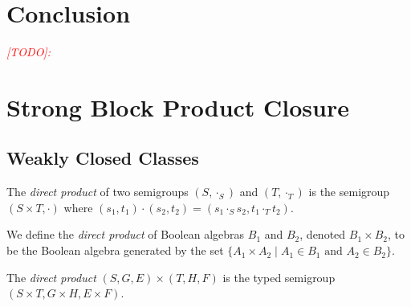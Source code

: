 \documentclass[a4paper,UKenglish,cleveref, autoref, thm-restate, anonymous]{lipics-v2021}
\newcommand{\todo}[1]{\textit{\textcolor{red}{[TODO]: #1}}}
\begin{document}
\iffalse
TODO: remove before submission if not included
\begin{corollary}
    \textsc{ALogTime}'s unique pseudovariety is the pseudovariety generated by $\emph{sbpc}_<(\{(\mathbb{Z}, \mathbb{Z}^+, \pm 1), (\mathbb{N}, \mathbb{S}, \{0,1\}), (S_5, \wp(S_5), S_5)\})$.
\end{corollary}



\begin{remark}
    Note that this is the same construction as the algebra for \textsc{DLogTime}-uniform TC${}^0$ except for the addition of the typed semigroup $(S_5, \wp(S_5), S_5)$.
\end{remark}
\fi

\section{Conclusion}\label{sec:conc}

\todo{}






\appendix

\section{Strong Block Product Closure}\label{app:bp}

\subsection{Weakly Closed Classes}

\begin{definition}
    The \emph{direct product} of two semigroups $(S, \cdot_S)$ and $(T, \cdot_T)$ is the semigroup $(S \times T, \cdot)$ where $(s_1, t_1) \cdot (s_2, t_2) = (s_1 \cdot_S s_2, t_1 \cdot_T t_2)$.
\end{definition}
\begin{definition}
    We define the \emph{direct product} of Boolean algebras $B_1$ and $B_2$, denoted $B_1 \times B_2$, to be the Boolean algebra generated by the set $\{A_1 \times A_2 \mid A_1 \in B_1 \text{ and } A_2 \in B_2\}$.
\end{definition}

\begin{definition}
    \item The \emph{direct product} $(S, G, E) \times (T, H, F)$ is the typed semigroup $(S \times T, G \times H, E \times F)$.
\end{definition}
\end{document}
